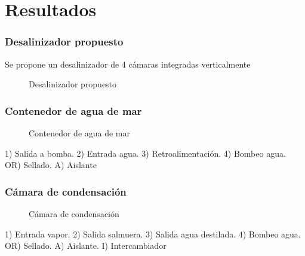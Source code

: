 \section{Resultados}

\begin{frame}
	\frametitle{Desalinizador propuesto}
	Se propone un desalinizador de 4 cámaras integradas verticalmente\\
	\begin{figure}
		\centering
		\caption{Desalinizador propuesto}
	\end{figure}
\end{frame}

\begin{frame}
	\frametitle{Contenedor de agua de mar}
	
	\begin{figure}
		\centering
		\caption{Contenedor de agua de mar}
	\end{figure}
	
	1) Salida a bomba. 2) Entrada agua. 3) Retroalimentación. 4) Bombeo agua.\\
	OR) Sellado. A) Aislante
	
\end{frame}

\begin{frame}
	\frametitle{Cámara de condensación}
	
	\begin{figure}
		\centering
		\caption{Cámara de condensación}
	\end{figure}
	
	1) Entrada vapor. 2) Salida salmuera. 3) Salida agua destilada. 4) Bombeo agua.\\
	
	OR) Sellado. A) Aislante. I) Intercambiador
	
\end{frame}

